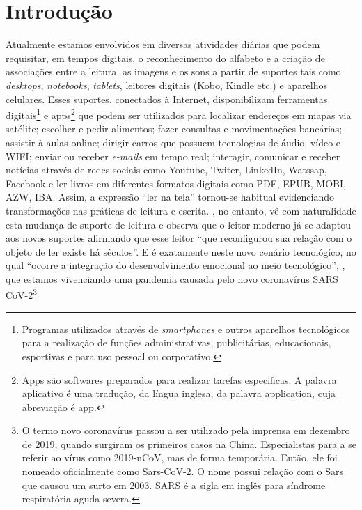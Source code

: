 \documentclass{textolivre}
\begin{document}
\section{Introdução}\label{sec-intro}
Atualmente estamos envolvidos em diversas atividades diárias que podem requisitar, em tempos digitais, o reconhecimento do alfabeto e a criação de associações entre a leitura, as imagens e os sons a partir de suportes tais como \textit{desktops}, \textit{notebooks}, \textit{tablets}, leitores digitais (Kobo, Kindle etc.) e aparelhos celulares. Esses suportes, conectados à Internet, disponibilizam ferramentas digitais\footnote{Programas utilizados através de \textit{smartphones} e outros aparelhos tecnológicos para a realização de funções administrativas, publicitárias, educacionais, esportivas e para uso pessoal ou corporativo.} e apps\footnote{Apps são softwares preparados para realizar tarefas especificas. A palavra aplicativo é uma tradução, da língua inglesa, da palavra application, cuja abreviação é app.} que podem ser utilizados para localizar endereços em mapas via satélite; escolher e pedir alimentos; fazer consultas e  movimentações bancárias; assistir à aulas online; dirigir carros que possuem tecnologias de áudio, vídeo e WIFI; enviar ou receber \textit{e-mails} em tempo real; interagir, comunicar e receber notícias através de redes sociais como Youtube, Twiter, LinkedIn, Watssap, Facebook e ler livros em diferentes formatos digitais como PDF, EPUB, MOBI, AZW, IBA. Assim, a expressão “ler na tela” tornou-se habitual evidenciando transformações nas práticas de leitura e escrita. \textcite{coscarelliribeiro_2005}, no entanto, vê com naturalidade esta mudança de suporte de leitura e observa que o leitor moderno já se adaptou aos novos suportes afirmando que esse leitor “que reconfigurou sua relação com o objeto de ler existe há séculos”.  E é exatamente neste novo cenário tecnológico, no qual “ocorre a integração do desenvolvimento emocional ao meio tecnológico”, \textcite{casatti_um_nodate}, que estamos vivenciando uma pandemia causada pelo novo coronavírus SARS CoV-2\footnote{O termo novo coronavírus passou a ser utilizado pela imprensa em dezembro de 2019, quando surgiram os primeiros casos na China. Especialistas para a se referir ao vírus como 2019-nCoV, mas de forma temporária. Então, ele foi nomeado oficialmente como Sars-CoV-2. O nome possui relação com o Sars que causou um surto em 2003. SARS é a sigla em inglês para síndrome respiratória aguda severa.
}
\end{document}
